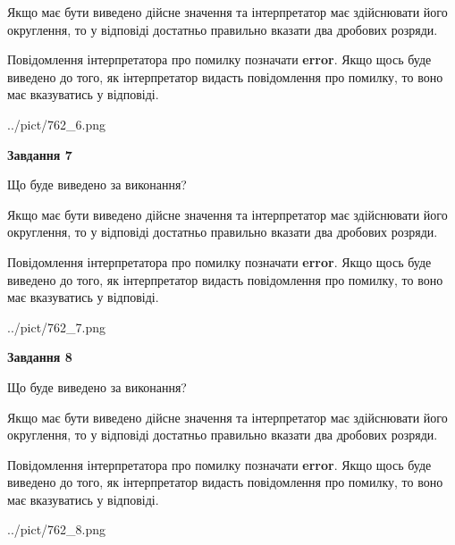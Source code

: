 \documentclass[12pt, ukrainian]{article}
\begin{document}
{\begin {Large}
Якщо має бути виведено дійсне значення та інтерпретатор має здійснювати його округлення, 
то у відповіді достатньо правильно вказати два дробових розряди.

Повідомлення інтерпретатора про помилку позначати \textbf{error}.
Якщо щось буде виведено до того, як інтерпретатор видасть повідомлення про помилку, 
то воно має вказуватись у відповіді. \par

\begin{center}
	{../pict/762_6.png}
\end{center}
\newpage

{\begin {center}\textbf{Завдання 7}\end {center}}\par
Що буде виведено за виконання? \par

Якщо має бути виведено дійсне значення та інтерпретатор має здійснювати його округлення, 
то у відповіді достатньо правильно вказати два дробових розряди.

Повідомлення інтерпретатора про помилку позначати \textbf{error}.
Якщо щось буде виведено до того, як інтерпретатор видасть повідомлення про помилку, 
то воно має вказуватись у відповіді. \par

\begin{center}
	{../pict/762_7.png}
\end{center}
\newpage

{\begin {center}\textbf{Завдання 8}\end {center}}\par
Що буде виведено за виконання? \par

Якщо має бути виведено дійсне значення та інтерпретатор має здійснювати його округлення, 
то у відповіді достатньо правильно вказати два дробових розряди.

Повідомлення інтерпретатора про помилку позначати \textbf{error}.
Якщо щось буде виведено до того, як інтерпретатор видасть повідомлення про помилку, 
то воно має вказуватись у відповіді. \par

\begin{center}
	{../pict/762_8.png}
\end{center}
\newpage


\end{Large}}
\end{document}
